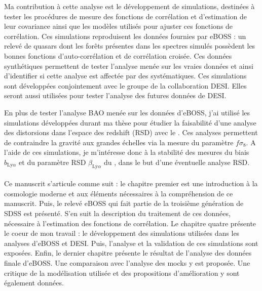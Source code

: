 Ma contribution à cette analyse est le développement de simulations, destinées à tester les procédures de mesure des fonctions de corrélation et d'estimation de leur covariance ainsi que les modèles utilisés pour ajuster ces fonctions de corrélation.
Ces simulations reproduisent les données fournies par eBOSS : un relevé de quasars dont les forêts \lya{} présentes dans les spectres simulés possèdent les bonnes fonctions d'auto-corrélation et de corrélation croisée.
Ces données synthétiques permettent de tester l'analyse menée sur les vraies données et ainsi d'identifier si cette analyse est affectée par des systématiques.
Ces simulations sont développées conjointement avec le groupe \lya{} de la collaboration DESI. Elles seront aussi utilisées pour tester l'analyse des futures données de DESI.

En plus de tester l'analyse BAO menée sur les données d'eBOSS, j'ai utilisé les simulations développées durant ma thèse pour étudier la faisabilité d'une analyse des distorsions dans l'espace des redshift (RSD) avec le \lya{}. Ces analyses permettent de contraindre la gravité aux grandes échelles via la mesure du paramètre $f \sigma_8$. A l'aide de ces simulations, je m'intéresse donc à la stabilité des mesures du biais $b_{\mathrm{Ly}\alpha}$ et du paramètre RSD $\beta_{\mathrm{Ly}\alpha}$ du \lya{}, dans le but d'une éventuelle analyse RSD.

\paragraph{}
Ce manuscrit s'articule comme suit : le chapitre premier est une introduction à la cosmologie moderne et aux éléments nécessaires à la compréhension de ce manuscrit.
Puis, le relevé eBOSS  qui fait partie de la troisième génération de SDSS est présenté.
S'en suit la description du traitement de ces données, nécessaire à l'estimation des fonctions de corrélation.
Le chapitre quatre présente le coeur de mon travail : le développement des simulations utilisées dans les analyses \lya{} d'eBOSS et DESI.
Puis, l'analyse et la validation de ces simulations sont exposées.
Enfin, le dernier chapitre présente le résultat de l'analyse des données finale d'eBOSS. Une comparaison avec l'analyse des mocks y est proposée.
Une critique de la modélisation utilisée et des propositions d'amélioration y sont également données.
